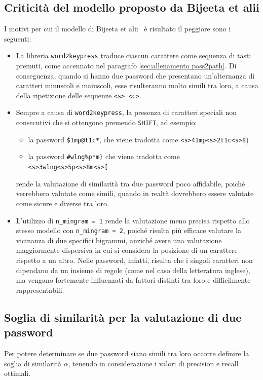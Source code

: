 \subsection{Criticità del modello proposto da Bijeeta et alii}
\label{sec:criticita bijeeta}
I motivi per cui il modello di Bijeeta et alii~\cite{bijeeta} è risultato il peggiore sono i seguenti:
\begin{itemize}
    \item La libreria \texttt{word2keypress} traduce ciascun carattere come sequenza di tasti premuti, come accennato nel paragrafo \ref{sec:allenamento pass2path}. Di conseguenza, quando si hanno due password che presentano un'alternanza di caratteri minuscoli e maiuscoli, esse risulteranno molto simili tra loro, a causa della ripetizione delle sequenze \texttt{<s> <c>}.
    \item Sempre a causa di \texttt{word2keypress}, la presenza di caratteri speciali non consecutivi che si ottengono premendo \texttt{SHIFT}, ad esempio:
    \begin{itemize}
        \item la password \texttt{\$1mp@t1c*}, che viene tradotta come \texttt{<s>41mp<s>2t1c<s>8})
        \item la password \texttt{\#wlng\%p*m\}} che viene tradotta come\\ \texttt{<s>3wlng<s>5p<s>8m<s>[}
    \end{itemize}
    rende la valutazione di similarità tra due password poco affidabile, poiché verrebbero valutate come simili, quando in realtà dovrebbero essere valutate come sicure e diverse tra loro.
    \item L'utilizzo di \texttt{n\_mingram = 1} rende la valutazione meno precisa rispetto allo stesso modello con \texttt{n\_mingram = 2}, poiché risulta più efficace valutare la vicinanza di due specifici bigrammi, anziché avere una valutazione maggiormente dispersiva in cui si considera la posizione di un carattere rispetto a un altro. Nelle password, infatti, risulta che i singoli caratteri non dipendano da un insieme di regole (come nel caso della letteratura inglese), ma vengano fortemente influenzati da fattori distinti tra loro e difficilmente rappresentabili.
\end{itemize}

\subsection{Soglia di similarità per la valutazione di due password}
\label{sec:soglia similarita valutazione due password}
Per potere determinare se due password siano simili tra loro occorre definire la soglia di similarità $\alpha$, tenendo in considerazione i valori di precision e recall ottimali.


